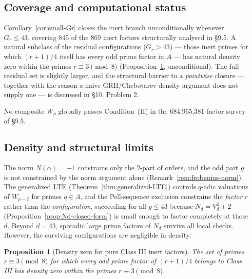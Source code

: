 \documentclass[12pt]{article}
\theoremstyle{plain}
\newtheorem{proposition}[theorem]{Proposition}
\theoremstyle{definition}
\theoremstyle{remark}
\begin{document}
\subsection{Coverage and computational status}


Corollary~\ref{cor:small-Gr} closes the inert branch unconditionally whenever
\(G_r \leq 43\), covering 845 of the 869 inert factors structurally
analysed in \S9.5. A natural subclass of the residual configurations
(\(G_r > 43\)) --- those inert primes for which \((r+1)/4\) itself
has every odd prime factor in \(A\) --- has natural density zero
within the primes \(r \equiv 3 \pmod 8\) (Proposition~\ref{prop:density-zero},
unconditional). The full residual set is slightly larger, and the
structural barrier to a \emph{pointwise} closure --- together with the
reason a naive GRH/Chebotarev density argument does not supply
one --- is discussed in \S10, Problem 2.

No composite \(W_p\) globally passes Condition~(II) in the
684{,}965{,}381-factor survey of \S9.5.

\subsection{Density and structural limits}

The norm \(N(\alpha) = -1\) constrains only the 2-part of orders,
and the odd part \(g\) is not constrained by the norm argument alone
(Remark~\ref{rem:frobenius-norm}). The generalized LTE (Theorem~\ref{thm:generalized-LTE}) controls \(q\)-adic
valuations of \(W_{p-2}\) for primes \(q \in A\), and the
Pell-sequence exclusion constrains the \emph{factor} \(r\) rather than
the \emph{configuration}, succeeding for all \(g \leq 43\) because
\(N_d = V_d^2 + 2\) (Proposition~\ref{prop:Nd-closed-form}) is small enough to factor completely at those \(d\). Beyond
\(d = 43\), sporadic large prime factors of \(N_d\) survive all
local checks. However, the surviving configurations are negligible
in density:

\begin{proposition}[Density zero for pure Class III inert factors]\label{prop:density-zero}
The set of primes \(r \equiv 3 \pmod{8}\) for which every odd prime
factor of \((r+1)/4\) belongs to Class III has density zero within
the primes \(r \equiv 3 \pmod{8}\).
\end{proposition}
\end{document}
